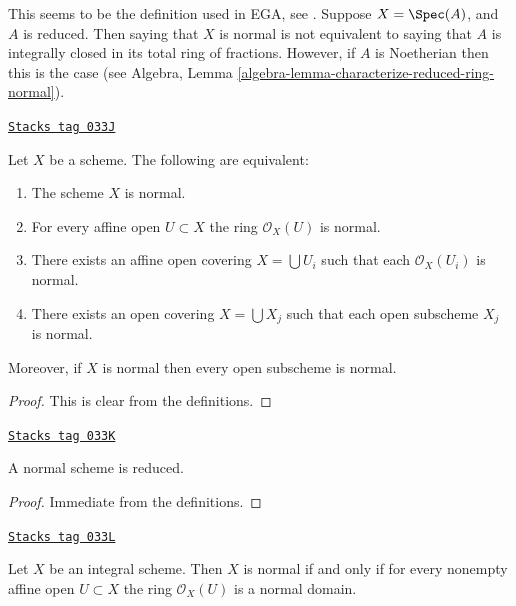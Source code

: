 This seems to be the definition used in EGA, see \cite[0, 4.1.4]{EGA}.
Suppose $X = \Spec(A)$, and $A$ is reduced. Then saying that $X$ is
normal is not equivalent to saying that $A$ is integrally closed in its
total ring of fractions. However, if $A$ is Noetherian then this is the case
(see Algebra, Lemma \ref{algebra-lemma-characterize-reduced-ring-normal}).

\begin{lemma}
\label{properties-lemma-locally-normal}
\href{https://stacks.math.columbia.edu/tag/033J}{\texttt{Stacks tag 033J}}

Let $X$ be a scheme. The following are equivalent:
\begin{enumerate}
\item The scheme $X$ is normal.
\item For every affine open $U \subset X$ the ring $\mathcal{O}_X(U)$
is normal.
\item There exists an affine open covering $X = \bigcup U_i$ such that
each $\mathcal{O}_X(U_i)$ is normal.
\item There exists an open covering $X = \bigcup X_j$
such that each open subscheme $X_j$ is normal.
\end{enumerate}
Moreover, if $X$ is normal then every open subscheme
is normal.
\end{lemma}

\begin{proof}
This is clear from the definitions.
\end{proof}

\begin{lemma}
\label{properties-lemma-normal-reduced}
\href{https://stacks.math.columbia.edu/tag/033K}{\texttt{Stacks tag 033K}}

A normal scheme is reduced.
\end{lemma}

\begin{proof}
Immediate from the definitions.
\end{proof}

\begin{lemma}
\label{properties-lemma-integral-normal}
\href{https://stacks.math.columbia.edu/tag/033L}{\texttt{Stacks tag 033L}}

Let $X$ be an integral scheme.
Then $X$ is normal if and only if for every nonempty affine open
$U \subset X$ the ring $\mathcal{O}_X(U)$ is a normal domain.
\end{lemma}

